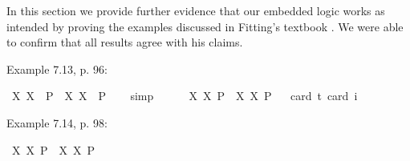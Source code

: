 \begin{isabellebody}
%
\isamarkuptrue%
%
\begin{isamarkuptext}%
In this section we provide further evidence that our embedded logic works as intended by proving the examples
 discussed in Fitting's textbook \cite{Fitting}. We were able to confirm that all results agree with his claims.%
\end{isamarkuptext}\isamarkuptrue%
%
\begin{isamarkuptext}%
Example 7.13, p. 96:%
\end{isamarkuptext}\isamarkuptrue%
\isamarkupfalse%
\ {\isachardoublequoteopen}{\isasymlfloor}{\isacharparenleft}{\isasymlambda}X{\isachardot}\ \isactrlbold {\isasymdiamond}\isactrlbold {\isasymexists}X{\isacharparenright}\ \ {\isacharparenleft}P{\isacharcolon}{\isacharcolon}{\isasymup}{\isasymlangle}{\isasymzero}{\isasymrangle}{\isacharparenright}\ \isactrlbold {\isasymrightarrow}\ \isactrlbold {\isasymdiamond}{\isacharparenleft}{\isacharparenleft}{\isasymlambda}X{\isachardot}\ \isactrlbold {\isasymexists}X{\isacharparenright}\ \ P{\isacharparenright}{\isasymrfloor}{\isachardoublequoteclose}%
\ \ %
%
\isamarkupfalse%
\ simp%
%
%
\ \ \ \ \isanewline
{}\isamarkupfalse%
\ {\isachardoublequoteopen}{\isasymlfloor}{\isacharparenleft}{\isasymlambda}X{\isachardot}\ \isactrlbold {\isasymdiamond}\isactrlbold {\isasymexists}X{\isacharparenright}\ \isactrlbold {\isasymdown}{\isacharparenleft}P{\isacharcolon}{\isacharcolon}{\isasymup}{\isasymlangle}{\isasymzero}{\isasymrangle}{\isacharparenright}\ \isactrlbold {\isasymrightarrow}\ \isactrlbold {\isasymdiamond}{\isacharparenleft}{\isacharparenleft}{\isasymlambda}X{\isachardot}\ \isactrlbold {\isasymexists}X{\isacharparenright}\ \isactrlbold {\isasymdown}P{\isacharparenright}{\isasymrfloor}{\isachardoublequoteclose}\isanewline
\ \ \isamarkupfalse%
{\isacharbrackleft}card\ {\isacharprime}t{\isacharequal}{}{\isacharcomma}\ card\ i{\isacharequal}{}{\isacharbrackright}%
\ %
%
\isamarkupfalse%
\ %
%
%
%
%
\begin{isamarkuptext}%
Example 7.14, p. 98:%
\end{isamarkuptext}\isamarkuptrue%
\isamarkupfalse%
\ {\isachardoublequoteopen}{\isasymlfloor}{\isacharparenleft}{\isasymlambda}X{\isachardot}\ \isactrlbold {\isasymdiamond}\isactrlbold {\isasymexists}X{\isacharparenright}\ \isactrlbold {\isasymdown}{\isacharparenleft}P{\isacharcolon}{\isacharcolon}{\isasymup}{\isasymlangle}{\isasymzero}{\isasymrangle}{\isacharparenright}\ \isactrlbold {\isasymrightarrow}\ {\isacharparenleft}{\isasymlambda}X{\isachardot}\ \isactrlbold {\isasymexists}X{\isacharparenright}\ \isactrlbold {\isasymdown}P{\isasymrfloor}{\isachardoublequoteclose}%

\end{isabellebody}
